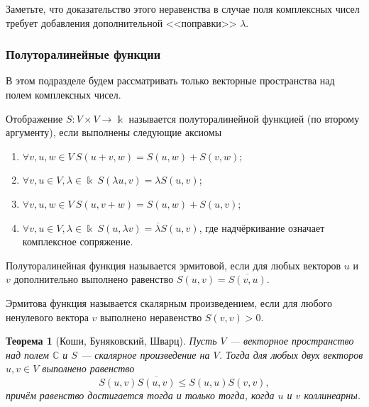 \documentclass[12pt]{article}
\newtheorem{theorem}{Теорема}
\numberwithin{theorem}{section}
\theoremstyle{definition}
\newcommand{\CC}{\mathbb{C}}
\newcommand{\defin}[2]{\hypertarget{#2}{{\color{red} #1}}}
\begin{document}
	Заметьте, что доказательство этого неравенства в случае поля комплексных чисел требует добавления дополнительной <<поправки>> $ \lambda $.
	
	\subsubsection{Полуторалинейные функции}
	
	В этом подразделе будем рассматривать только векторные пространства над полем комплексных чисел.
	
	Отображение $ S \colon V \times V \to \Bbbk $ называется \defin{полуторалинейной функцией (по второму аргументу)}{sesquilinear}, если выполнены следующие аксиомы
	\begin{enumerate}
		\item $ \forall v,u,w \in V \ S(u + v, w) = S(u, w) + S(v, w) $;
		\item $ \forall v,u \in V, \lambda \in \Bbbk \ S(\lambda u, v) = \lambda S(u, v) $;
		\item $ \forall v,u,w \in V \ S(u, v + w) = S(u, w) + S(u, v) $;
		\item $ \forall v,u \in V, \lambda \in \Bbbk \ S(u, \lambda v) = \overline{\lambda} S(u, v) $,
		где надчёркивание означает комплексное сопряжение.
	\end{enumerate}
	
	Полуторалинейная функция называется \defin{эрмитовой}{hermitian}, если для любых векторов $ u $ и $ v $ дополнительно выполнено равенство
	$ S(u, v) = \overline{S(v, u)} $.
	
	Эрмитова функция называется \defin{скалярным произведением}{C-inner-product}, если для любого ненулевого вектора $ v $
	выполнено неравенство $ S(v, v) > 0 $.
	
	
	\begin{theorem}[Коши, Буняковский, Шварц] \label{Cauchy-complex}
		Пусть $ V $ --- векторное пространство над полем $ \CC $ и $ S $ --- скалярное произведение на $ V $.
		Тогда для любых двух векторов $ u, v \in V $ выполнено равенство
		$$ S(u, v)\overline{S(u,v)} \leqslant S(u,u)S(v,v), $$
		причём равенство достигается тогда и только тогда, когда $ u $ и $ v $ коллинеарны.
	\end{theorem}
	
\end{document}
